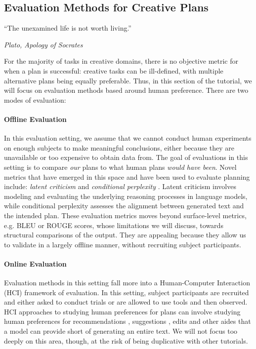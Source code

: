 \documentclass[11pt]{article}
\begin{document}
\subsection{Evaluation Methods for Creative Plans}

\epigraph{
``The unexamined life is not worth living.''
}{\textit{Plato, \textit{Apology of Socrates}}}

For the majority of tasks in creative domains, there is no objective metric for when a plan is successful: creative tasks can be ill-defined, with multiple alternative plans being equally preferable. Thus, in this section of the tutorial, we will focus on evaluation methods based around human preference. There are two modes of evaluation:


\paragraph{Offline Evaluation}

In this evaluation setting, we assume that we cannot conduct human experiments on enough subjects to make meaningful conclusions, either because they are unavailable or too expensive to obtain data from. The goal of evaluations in this setting is to compare \textit{our} plans to what human plans \textit{would have been}. Novel metrics that have emerged in this space and have been used to evaluate planning include: \textit{latent criticism} \cite{shi2023large} and \textit{conditional perplexity} \cite{chen2019evaluating}. Latent criticism involves modeling and evaluating the underlying reasoning processes in language models, while conditional perplexity assesses the alignment between generated text and the intended plan. These evaluation metrics moves beyond surface-level metrics, e.g. BLEU or ROUGE scores, whose limitations we will discuss, towards structural comparisons of the output. They are appealing because they allow us to validate in a largely offline manner, without recruiting subject participants. 

\paragraph{Online Evaluation}

Evaluation methods in this setting fall more into a Human-Computer Interaction (HCI) framework of evaluation. In this setting, subject participants are recruited and either asked to conduct trials or are allowed to use tools and then observed. HCI approaches to studying human preferences for plans can involve studying human preferences for recommendations \cite{spangher2015building, zhao2023recommender}, suggestions \cite{clark2021choose}, edits \cite{laban2024beyond} and other aides that a model can provide short of generating an entire text. We will not focus too deeply on this area, though, at the risk of being duplicative with other tutorials.
\end{document}
